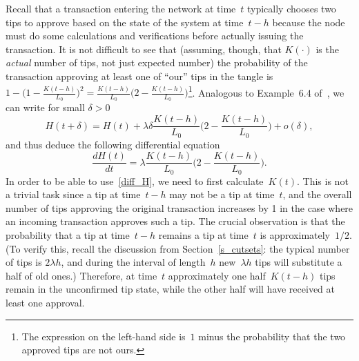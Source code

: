 \documentclass[12pt]{article}
\begin{document}
\begin{CJK}{UTF8}{bkai}
Recall that a transaction 
entering the network at time~$t$ typically 
chooses two 
tips to approve based on the state
of the system at time~$t-h$ because the node must do
some calculations and verifications before actually issuing the 
transaction. 
It is not difficult to see that
(assuming, though, that $K(\cdot)$ is the \emph{actual}
number of tips, not just expected number)
the probability of the transaction approving at least one of ``our'' tips
 in the tangle is
$1-\big(1-\frac{K(t-h)}{L_0}\big)^2
=\frac{K(t-h)}{L_0}\big(2-\frac{K(t-h)}{L_0}\big)$\footnote{The expression on the left-hand
 side is~$1$ minus the probability that the two approved tips are not ours.}.
Analogous to Example~6.4 of~\cite{Ross_m},
we can write for small $\delta>0$
\[
 H(t+\delta) = H(t) 
+ \lambda \delta\frac{K(t-h)}{L_0}\Big(2-\frac{K(t-h)}{L_0}\Big)
 + o(\delta),
\]
and thus deduce the following differential equation
\begin{equation}
\label{diff_H}
 \frac{d H(t)}{dt} = \lambda \frac{K(t-h)}{L_0}\Big(2-\frac{K(t-h)}{L_0}\Big).
\end{equation}
In order to be able to use~\eqref{diff_H}, we need to first 
calculate~$K(t)$.
This is not a trivial task since a tip at time~$t-h$ 
may not be a tip at time~$t$, 
and the overall number of tips approving the original transaction 
increases by 1 in the case where an incoming transaction 
approves such a tip.
The crucial observation
is that the probability that a tip at time~$t-h$ remains a tip
at time~$t$ is approximately~$1/2$. 
(To verify this, recall the discussion from 
Section~\ref{s_cutsets}: the typical number of tips
is $2\lambda h$, and during the interval of length~$h$
new~$\lambda h$ tips will substitute a half of old ones.)
 Therefore, at time~$t$ approximately one half~$K(t-h)$ 
tips remain in the unconfirmed tip state, while the other half
will have received at least one approval. 

\end{CJK}
\end{document}
